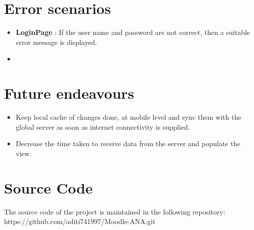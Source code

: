 \documentclass{article}
\begin{document}
\section{Error scenarios}
\begin{itemize}
\item \textbf{LoginPage} : If the user name and password are not correct, then a suitable error message is displayed.

\item \textbf{}
\end{itemize}


\section{Future endeavours}
\begin{itemize}
\item Keep local cache of changes done, at mobile level and sync them with the global server as soon as internet connectivity is supplied.
\item Decrease the time taken to receive data from the server and populate the view.
\end{itemize}


\section{Source Code}
\par\noindent The source code of the project is maintained in the following repository:\\
https://github.com/aditi741997/Moodle-ANA.git


\medskip

\end{document}
